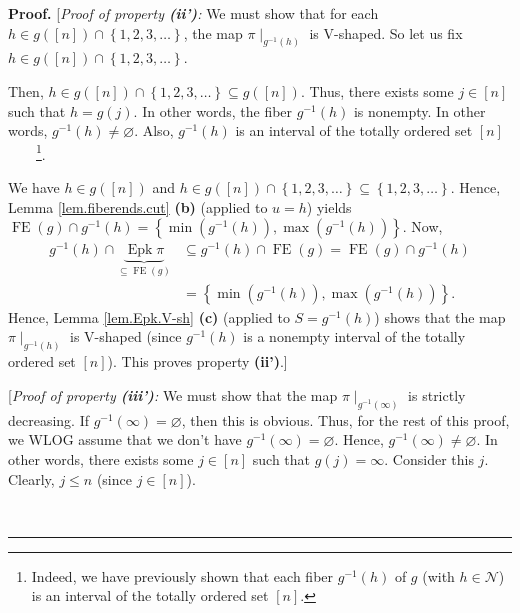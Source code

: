 \documentclass[numbers=enddot,12pt,final,onecolumn,notitlepage]{scrartcl}%
\theoremstyle{definition}
\newenvironment{proof}[1][Proof]{\noindent\textbf{#1.} }{\ \rule{0.5em}{0.5em}}
\newenvironment{verlong}{}{}
\begin{document}
\begin{verlong}
\begin{proof}
[\textit{Proof of property \textbf{(ii')}:} We must show that for each $h\in
g\left(  \left[  n\right]  \right)  \cap\left\{  1,2,3,\ldots\right\}  $, the
map $\pi\mid_{g^{-1}\left(  h\right)  }$ is V-shaped. So let us fix $h\in
g\left(  \left[  n\right]  \right)  \cap\left\{  1,2,3,\ldots\right\}  $.

Then, $h\in g\left(  \left[  n\right]  \right)  \cap\left\{  1,2,3,\ldots
\right\}  \subseteq g\left(  \left[  n\right]  \right)  $. Thus, there exists
some $j\in\left[  n\right]  $ such that $h=g\left(  j\right)  $. In other
words, the fiber $g^{-1}\left(  h\right)  $ is nonempty. In other words,
$g^{-1}\left(  h\right)  \neq\varnothing$. Also, $g^{-1}\left(  h\right)  $ is
an interval of the totally ordered set $\left[  n\right]  $%
\ \ \ \ \footnote{Indeed, we have previously shown that each fiber
$g^{-1}\left(  h\right)  $ of $g$ (with $h\in\mathcal{N}$) is an interval of
the totally ordered set $\left[  n\right]  $.}.

We have $h\in g\left(  \left[  n\right]  \right)  $ and $h\in g\left(  \left[
n\right]  \right)  \cap\left\{  1,2,3,\ldots\right\}  \subseteq\left\{
1,2,3,\ldots\right\}  $. Hence, Lemma \ref{lem.fiberends.cut} \textbf{(b)}
(applied to $u=h$) yields \newline
$\operatorname*{FE}\left(  g\right)  \cap
g^{-1}\left(  h\right)  =\left\{  \min\left(  g^{-1}\left(  h\right)  \right)
,\max\left(  g^{-1}\left(  h\right)  \right)  \right\}  $. Now,%
\begin{align*}
g^{-1}\left(  h\right)  \cap\underbrace{\operatorname{Epk}\pi}_{\subseteq
\operatorname*{FE}\left(  g\right)  }
&\subseteq g^{-1}\left(  h\right)
\cap\operatorname*{FE}\left(  g\right)  =\operatorname*{FE}\left(  g\right)
\cap g^{-1}\left(  h\right) \\
& =\left\{  \min\left(  g^{-1}\left(  h\right)
\right)  ,\max\left(  g^{-1}\left(  h\right)  \right)  \right\}  .
\end{align*}
Hence, Lemma \ref{lem.Epk.V-sh} \textbf{(c)} (applied to $S=g^{-1}\left(
h\right)  $) shows that the map $\pi\mid_{g^{-1}\left(  h\right)  }$ is
V-shaped (since $g^{-1}\left(  h\right)  $ is a nonempty interval of the
totally ordered set $\left[  n\right]  $). This proves property \textbf{(ii')}.]

[\textit{Proof of property \textbf{(iii')}:} We must show that the map
$\pi\mid_{g^{-1}\left(  \infty\right)  }$ is strictly decreasing. If
$g^{-1}\left(  \infty\right)  =\varnothing$, then this is obvious. Thus, for
the rest of this proof, we WLOG assume that we don't have $g^{-1}\left(
\infty\right)  =\varnothing$. Hence, $g^{-1}\left(  \infty\right)
\neq\varnothing$. In other words, there exists some $j\in\left[  n\right]  $
such that $g\left(  j\right)  =\infty$. Consider this $j$. Clearly, $j\leq n$
(since $j\in\left[  n\right]  $).


\end{proof}
\end{verlong}
\end{document}

